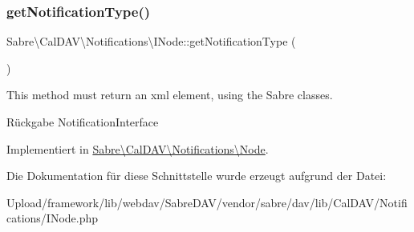 \subsubsection{\texorpdfstring{get\+Notification\+Type()}{getNotificationType()}}
{\footnotesize\ttfamily Sabre\textbackslash{}\+Cal\+D\+A\+V\textbackslash{}\+Notifications\textbackslash{}\+I\+Node\+::get\+Notification\+Type (\begin{DoxyParamCaption}{ }\end{DoxyParamCaption})}

This method must return an xml element, using the Sabre classes.

\begin{DoxyReturn}{Rückgabe}
Notification\+Interface 
\end{DoxyReturn}


Implementiert in \mbox{\hyperlink{class_sabre_1_1_cal_d_a_v_1_1_notifications_1_1_node_ac2b3cb401257a3a7b3ab48645d9606b3}{Sabre\textbackslash{}\+Cal\+D\+A\+V\textbackslash{}\+Notifications\textbackslash{}\+Node}}.



Die Dokumentation für diese Schnittstelle wurde erzeugt aufgrund der Datei\+:\begin{DoxyCompactItemize}
\item 
Upload/framework/lib/webdav/\+Sabre\+D\+A\+V/vendor/sabre/dav/lib/\+Cal\+D\+A\+V/\+Notifications/I\+Node.\+php\end{DoxyCompactItemize}
